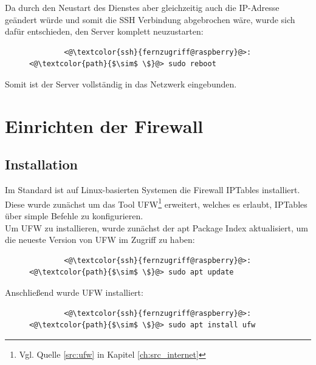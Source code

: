\documentclass[a4paper, 12pt]{scrartcl}
\begin{document}
Da durch den Neustart des Dienstes aber gleichzeitig auch die IP-Adresse geändert würde und somit die SSH Verbindung abgebrochen wäre, wurde sich dafür entschieden,
den Server komplett neuzustarten:
\begin{figure}[H]
    \begin{mdframed}[backgroundcolor=bbg]
        \begin{lstlisting}
        <@\textcolor{ssh}{fernzugriff@raspberry}@>:<@\textcolor{path}{$\sim$ \$}@> sudo reboot
        \end{lstlisting}
    \end{mdframed}
    \label{lst:restart_raspi}
\end{figure}
Somit ist der Server vollständig in das Netzwerk eingebunden.



\section{Einrichten der Firewall}
\subsection{Installation}\label{ch:firewall_inst}
Im Standard ist auf Linux-basierten Systemen die Firewall IPTables installiert. Diese wurde zunächst um das Tool \glqq UFW\grqq{}\footnote{Vgl. Quelle \ref{src:ufw} in Kapitel \ref{ch:src_internet}}
erweitert, welches es erlaubt, IPTables über simple Befehle zu konfigurieren.
\\
Um UFW zu installieren, wurde zunächst der apt Package Index aktualisiert, um die neueste Version von UFW im Zugriff zu haben:
\begin{figure}[H]
    \begin{mdframed}[backgroundcolor=bbg]
        \begin{lstlisting}
        <@\textcolor{ssh}{fernzugriff@raspberry}@>:<@\textcolor{path}{$\sim$ \$}@> sudo apt update
        \end{lstlisting}
    \end{mdframed}
    \label{lst:update_apt}
\end{figure}
Anschließend wurde UFW installiert:
\begin{figure}[H]
    \begin{mdframed}[backgroundcolor=bbg]
        \begin{lstlisting}
        <@\textcolor{ssh}{fernzugriff@raspberry}@>:<@\textcolor{path}{$\sim$ \$}@> sudo apt install ufw
        \end{lstlisting}
    \end{mdframed}
    \label{lst:install_ufw}
\end{figure}
\end{document}
